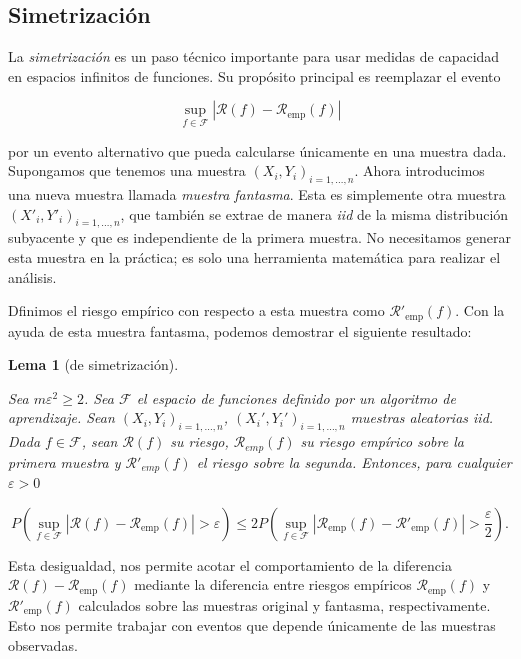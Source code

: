 \documentclass{report}
\newtheorem{lem}{Lema}[section]
\begin{document}
\subsection{Simetrización}

La \textit{simetrización} es un paso técnico importante para usar medidas de capacidad en espacios infinitos de
funciones. Su propósito principal es reemplazar el evento

\[
\sup_{f \in \mathcal{F}} |\mathcal{R}(f) - \mathcal{R}_{\text{emp}}(f)|
\]

por un evento alternativo que pueda calcularse únicamente en una muestra dada. Supongamos que tenemos una muestra
\((X_i, Y_i)_{i=1,\dots,n}\). Ahora introducimos una nueva muestra llamada \textit{muestra fantasma}.
Esta es simplemente otra muestra \((X'_i, Y'_i)_{i=1,\dots,n}\), que también se extrae de manera
\textit{iid} de la misma distribución subyacente y que es independiente de la primera muestra. No necesitamos generar
esta muestra en la práctica; es solo una herramienta matemática para realizar el análisis.

Dfinimos el riesgo empírico con respecto a esta muestra como \(\mathcal{R}'_{\text{emp}}(f)\).
Con la ayuda de esta muestra fantasma, podemos demostrar el siguiente resultado:

\begin{lem}[de simetrización] \label{lema de simetrizacion}

Sea $m\varepsilon^2 \geq 2$. Sea $\mathcal{F}$ el espacio de funciones definido por un algoritmo de aprendizaje. Sean
$(X_i,Y_i)_{i=1,\dots, n}$, $(X_i',Y_i')_{i=1,\dots, n}$ muestras aleatorias iid. Dada $f \in\mathcal{F}$,
sean $\mathcal{R}(f)$ su riesgo, $\mathcal{R}_{emp}(f)$ su riesgo empírico sobre la primera muestra y
$\mathcal{R}'_{emp}(f)$ el riesgo sobre la segunda. Entonces, para cualquier $\varepsilon > 0$

\[
P\left(\sup_{f \in \mathcal{F}} |\mathcal{R}(f) - \mathcal{R}_{\text{emp}}(f)| >
\varepsilon \right) \leq 2P\left(\sup_{f \in \mathcal{F}} |\mathcal{R}_{\text{emp}}(f) - \mathcal{R}'_{\text{emp}}(f)| > \frac{\varepsilon}{2}\right).
\]
\end{lem}

Esta desigualdad, nos permite acotar el comportamiento
de la diferencia \(\mathcal{R}(f) - \mathcal{R}_{\text{emp}}(f)\) mediante la diferencia entre riesgos empíricos \(\mathcal{R}_{\text{emp}}(f)\) y
\(\mathcal{R}'_{\text{emp}}(f)\) calculados sobre las muestras original y fantasma, respectivamente. Esto nos permite trabajar
con eventos que depende únicamente de las muestras observadas.
\end{document}

